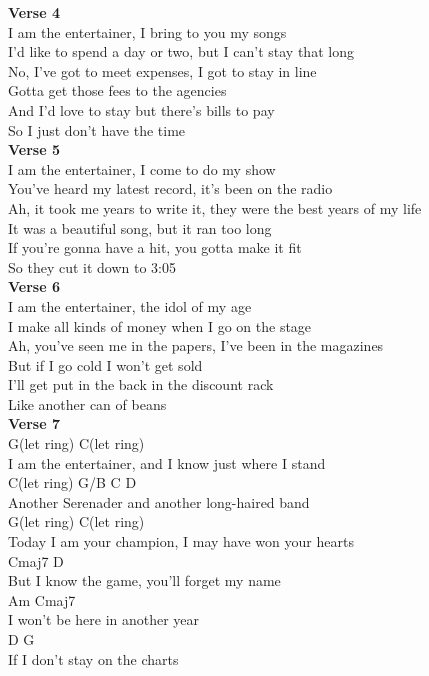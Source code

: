 \documentclass[a4paper]{article}
\begin{document}
{{        }
        \textbf{Verse 4}
        ~\\
        {
            \cutive
            \obeyspaces
I am the entertainer, I bring to you my songs
\\
I'd like to spend a day or two, but I can't stay that long
\\
No, I've got to meet expenses, I got to stay in line
\\
Gotta get those fees to the agencies
\\
And I'd love to stay but there's bills to pay
\\
So I just don't have the time
\\

        }
        \textbf{Verse 5}
        ~\\
        {
            \cutive
            \obeyspaces
I am the entertainer, I come to do my show
\\
You've heard my latest record, it's been on the radio
\\
Ah, it took me years to write it, they were the best years of my life
\\
It was a beautiful song, but it ran too long
\\
If you're gonna have a hit, you gotta make it fit
\\
So they cut it down to 3:05
\\

        }
        \textbf{Verse 6}
        ~\\
        {
            \cutive
            \obeyspaces
I am the entertainer, the idol of my age
\\
I make all kinds of money when I go on the stage
\\
Ah, you've seen me in the papers, I've been in the magazines
\\
But if I go cold I won't get sold
\\
I'll get put in the back in the discount rack
\\
Like another can of beans
\\

        }
        \textbf{Verse 7}
        ~\\
        {
            \cutive
            \obeyspaces
  G(let ring)               C(let ring)
\\
I am the entertainer, and I know just where I stand
\\
 C(let ring)    G/B     C                 D  
\\
Another Serenader and another long-haired band
\\
  G(let ring)               C(let ring)  
\\
Today I am your champion, I may have won your hearts
\\
      Cmaj7                    D
\\
But I know the game, you'll forget my name
\\
  Am                Cmaj7
\\
I won't be here in another year
\\
     D                  G 
\\
If I don't stay on the charts\\

        }
    }
\end{document}
